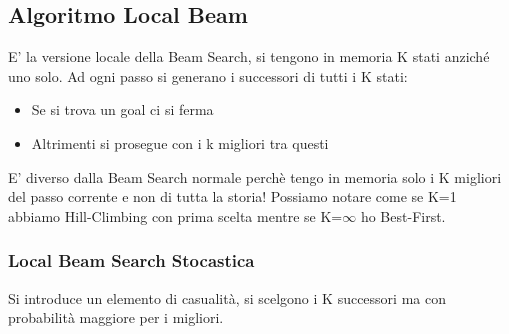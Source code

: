 \documentclass{article}
\begin{document}
\subsection{Algoritmo Local Beam}
E' la versione locale della Beam Search, si tengono in memoria K stati anziché uno solo. Ad ogni passo si generano i successori di tutti i K stati:
\begin{itemize}
    \item Se si trova un goal ci si ferma
    \item Altrimenti si prosegue con i k migliori tra questi
\end{itemize}
E' diverso dalla Beam Search normale perchè tengo in memoria solo i K migliori del passo corrente e non di tutta la storia! Possiamo notare come se K=1 abbiamo Hill-Climbing con prima scelta mentre se K=$\infty$ ho Best-First.

\subsubsection{Local Beam Search Stocastica}
Si introduce un elemento di casualità, si scelgono i K successori ma con probabilità maggiore per i migliori.
\end{document}
